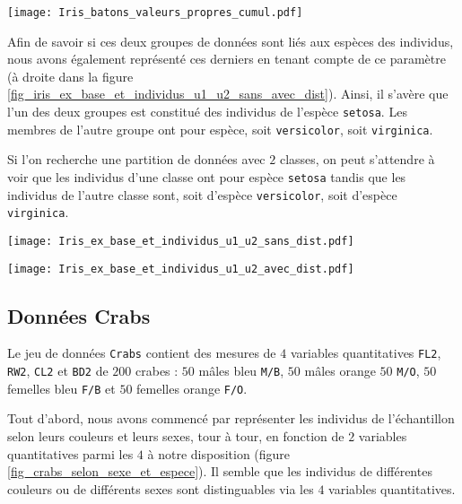 \documentclass{article}
\begin{document}
\begin{multicols}{2}
\begingroup
   \centering
   \texttt{[image: Iris\_batons\_valeurs\_propres\_cumul.pdf]}
    \label{fig_Iris_batons_valeurs_propres_cumul}
\endgroup

Afin de savoir si ces deux groupes de données sont liés aux espèces des individus, nous avons également représenté ces derniers en tenant compte de ce paramètre (à droite dans la figure \ref{fig_iris_ex_base_et_individus_u1_u2_sans_avec_dist}). Ainsi, il s'avère que l'un des deux groupes est constitué des individus de l'espèce \texttt{setosa}. Les membres de l'autre groupe ont pour espèce, soit \texttt{versicolor}, soit \texttt{virginica}.

Si l'on recherche une partition de données avec $2$ classes, on peut s'attendre à voir que les individus d'une classe ont pour espèce \texttt{setosa} tandis que les individus de l'autre classe sont, soit d'espèce \texttt{versicolor}, soit d'espèce \texttt{virginica}.

\begingroup
	\centering
   \begin{minipage}[c]{0.23\textwidth}
      \centering \texttt{[image: Iris\_ex\_base\_et\_individus\_u1\_u2\_sans\_dist.pdf]}
   \end{minipage}\hfill
   \begin{minipage}[c]{0.23\textwidth}   
      \centering \texttt{[image: Iris\_ex\_base\_et\_individus\_u1\_u2\_avec\_dist.pdf]}
   \end{minipage}
     \label{fig_iris_ex_base_et_individus_u1_u2_sans_avec_dist}
\endgroup


\subsection{Données Crabs}
\label{subsec_visualisation_donnes_crabs}
Le jeu de données \texttt{Crabs} contient des mesures de $4$ variables quantitatives \texttt{FL2}, \texttt{RW2}, \texttt{CL2} et \texttt{BD2} de $200$ crabes : $50$ mâles bleu \texttt{M/B}, $50$ mâles orange $50$ \texttt{M/O}, $50$ femelles bleu \texttt{F/B} et $50$ femelles orange \texttt{F/O}.

Tout d'abord, nous avons commencé par représenter les individus de l'échantillon selon leurs couleurs et leurs sexes, tour à tour, en fonction de $2$ variables quantitatives parmi les $4$ à notre disposition (figure \ref{fig_crabs_selon_sexe_et_espece}). Il semble que les individus de différentes couleurs ou de différents sexes sont distinguables via les $4$ variables quantitatives.


\end{multicols}
\end{document}
